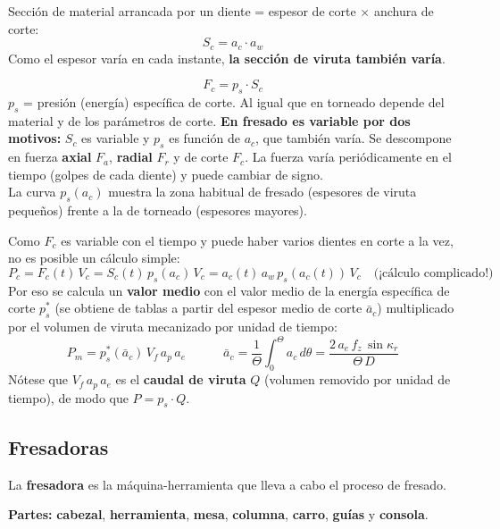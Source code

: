 \documentclass[12pt,a4paper]{article}
\begin{document}
\begin{formu}
	Sección de material arrancada por un diente = espesor de corte $\times$
	anchura de corte:
	\[ S_c = a_c \cdot a_w \]
	Como el espesor varía en cada instante, \textbf{la sección de viruta también
		varía}.
\end{formu}

\begin{formu}
	\[ F_c = p_s \cdot S_c \]
	$p_s$ = presión (energía) específica de corte. Al igual que en torneado
	depende del material y de los parámetros de corte. \textbf{En fresado es
		variable por dos motivos:} $S_c$ es variable y $p_s$ es función de $a_c$,
	que
	también varía. Se descompone en fuerza \textbf{axial} $F_a$, \textbf{radial}
	$F_r$ y de corte $F_c$. La fuerza varía periódicamente en el tiempo (golpes de
	cada diente) y puede cambiar de signo.\\
	La curva $p_s(a_c)$ muestra la zona habitual de fresado (espesores de viruta
	pequeños) frente a la de torneado (espesores mayores).
\end{formu}

\begin{formu}
	Como $F_c$ es variable con el tiempo y puede haber varios dientes en corte a
	la vez, no es posible un cálculo simple:
	\[ P_c = F_c(t)\, V_c = S_c(t)\, p_s(a_c)\, V_c = a_c(t)\, a_w\, p_s(a_c(t))\,
		V_c \quad \text{(¡cálculo complicado!)} \]
	Por eso se calcula un \textbf{valor medio} con el valor medio de la energía
	específica de corte $p_s^*$ (se obtiene de tablas a partir del espesor medio
	de
	corte $\bar a_c$) multiplicado por el volumen de viruta mecanizado por unidad
	de
	tiempo:
	\[ P_m = p_s^*(\bar a_c)\, V_f\, a_p\, a_e \qquad\quad \bar a_c =
		\frac{1}{\Theta}\int_0^{\Theta} a_c\, d\theta = \frac{2\, a_e\, f_z\,
			\sin\kappa_r}{\Theta\, D} \]
	Nótese que $V_f\, a_p\, a_e$ es el \textbf{caudal de viruta} $Q$ (volumen
	removido por unidad de tiempo), de modo que $P = p_s\cdot Q$.
\end{formu}

\subsection{Fresadoras}
La \textbf{fresadora} es la máquina-herramienta que lleva a cabo el proceso de
fresado.

\textbf{Partes:} \textbf{cabezal}, \textbf{herramienta}, \textbf{mesa},
\textbf{columna}, \textbf{carro}, \textbf{guías} y \textbf{consola}.
\end{document}
